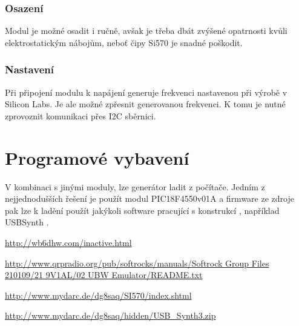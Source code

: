 \documentclass[12pt,a4paper,oneside]{article}
\begin{document}
\subsubsection{Osazení}

Modul je možné osadit i ručně, avšak je třeba dbát zvýšené opatrnosti kvůli elektrostatickým nábojům, neboť čipy Si570 je snadné poškodit.

\subsubsection{Nastavení}
Při připojení modulu k napájení generuje frekvenci nastavenou při výrobě v Silicon Labs. Je ale možné zpřesnit generovanou frekvenci. K tomu je nutné zprovoznit komunikaci přes I2C sběrnici. 

\section{Programové vybavení}
V kombinaci s jinými moduly, lze generátor ladit z počítače. Jedním z nejjednodušších řešení je použít modul PIC18F4550v01A a firmware ze zdroje \cite{DG8SAQemulator} pak lze k ladění použít jakýkoli software pracující s konstrukcí \cite{DG8SAQSynthesizer}, například USBSynth \cite{USB_Synth}.


\begin{thebibliography}{99}
\href{http://wb6dhw.com/inactive.html}{http://wb6dhw.com/inactive.html}

\href{http://www.qrpradio.org/pub/softrocks/manuals/Softrock Group Files 210109/21 9V1AL/02 UBW Emulator/README.txt}{http://www.qrpradio.org/pub/softrocks/manuals/Softrock Group Files 210109/21 9V1AL/02 UBW Emulator/README.txt}

\href{http://www.mydarc.de/dg8saq/SI570/index.shtml}{http://www.mydarc.de/dg8saq/SI570/index.shtml}

\href{ http://www.mydarc.de/dg8saq/hidden/USB\_Synth3.zip}{http://www.mydarc.de/dg8saq/hidden/USB\_Synth3.zip}

\end{thebibliography}
\end{document}

